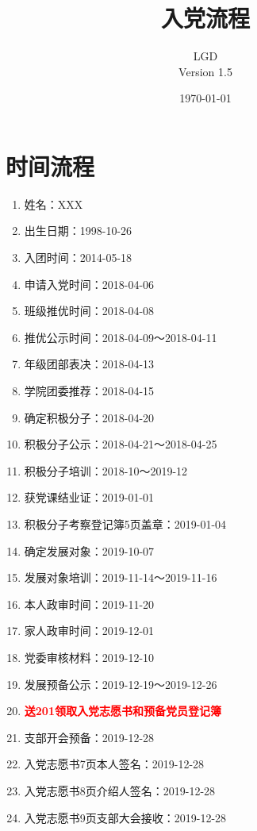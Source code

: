 \documentclass[fontset=windows]{ctexart}
\title{入党流程}
\author{LGD \\ Version 1.5}
\date{\today}
\begin{document}
\maketitle
\newpage
\section{时间流程}

\begin{tcolorbox}
    \begin{multicols}{2}
        \begin{enumerate}
            \item 姓名：XXX
            \item 出生日期：1998-10-26
            \item 入团时间：2014-05-18
            \item 申请入党时间：2018-04-06
            \item 班级推优时间：2018-04-08
            \item 推优公示时间：2018-04-09～2018-04-11
            \item 年级团部表决：2018-04-13
            \item 学院团委推荐：2018-04-15
            \item 确定积极分子：2018-04-20
            \item 积极分子公示：2018-04-21～2018-04-25
            \item 积极分子培训：2018-10～2019-12
            \item 获党课结业证：2019-01-01
            \item 积极分子考察登记簿5页盖章：2019-01-04
            \item 确定发展对象：2019-10-07
            \item 发展对象培训：2019-11-14～2019-11-16
            \item 本人政审时间：2019-11-20
            \item 家人政审时间：2019-12-01
            \item 党委审核材料：2019-12-10
            \item 发展预备公示：2019-12-19～2019-12-26
            \item \textcolor{red}{\textbf{送201领取入党志愿书和预备党员登记簿}}
            \item 支部开会预备：2019-12-28
            \item 入党志愿书7页本人签名：2019-12-28
            \item 入党志愿书8页介绍人签名：2019-12-28
            \item 入党志愿书9页支部大会接收：2019-12-28

\end{enumerate}
\end{multicols}
\end{tcolorbox}
\end{document}
